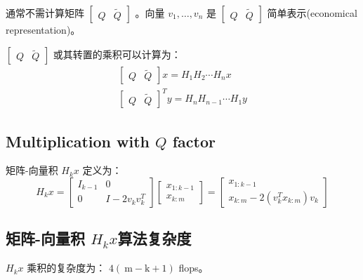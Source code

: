 通常不需计算矩阵 $ \left[\begin{array}{ll}Q & \tilde{Q}\end{array}\right] $ 。向量 $ v_{1}, \ldots, v_{n} $ 是 $ \left[\begin{array}{ll}Q & \tilde{Q}\end{array}\right] $ 简单表示(economical representation)。

\begin{theorem}
    $ \left[\begin{array}{ll}Q & \tilde{Q}\end{array}\right] $ 或其转置的乘积可以计算为：
$$
\begin{array}{c}
{\left[\begin{array}{cc}
Q & \tilde{Q}
\end{array}\right] x=H_{1} H_{2} \cdots H_{n} x} \\
{\left[\begin{array}{ll}
Q & \tilde{Q}
\end{array}\right]^{T} y=H_{n} H_{n-1} \cdots H_{1} y}
\end{array}
$$
\end{theorem}

\subsection{Multiplication with $Q$ factor}

\begin{definition}[矩阵-向量积 $ H_{k} x $]
    矩阵-向量积 $ H_{k} x $ 定义为：
$$
H_{k} x=\left[\begin{array}{cc}
I_{k-1} & 0 \\
0 & I-2 v_{k} v_{k}^{T}
\end{array}\right]\left[\begin{array}{c}
x_{1: k-1} \\
x_{k: m}
\end{array}\right]=\left[\begin{array}{c}
x_{1: k-1} \\
x_{k: m}-2\left(v_{k}^{T} x_{k: m}\right) v_{k}
\end{array}\right]
$$
\end{definition}

\subsection{矩阵-向量积 $ H_{k} x $算法复杂度}

$ H_{k} x $ 乘积的复杂度为： $ 4(\mathrm{~m}-\mathrm{k}+1) $ flops。

